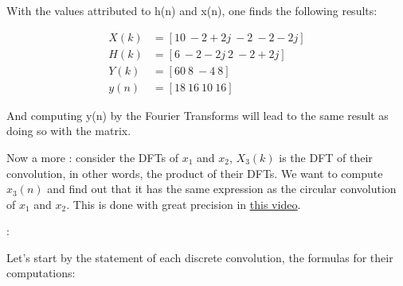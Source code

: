 \documentclass[12pt, a4paper]{article}
\begin{document}
With the values attributed to h(n) and x(n), one finds the following results:

\begin{align*}
    X(k) &= [10 \ -2+2j \ -2 \ -2-2j] \\
    H(k) &= [6 \ -2-2j \ 2 \ -2+2j] \\
    Y(k) &= [60 \ 8 \ -4 \ 8] \\
    y(n) &= [18 \ 16 \ 10 \ 16]
\end{align*}

And computing y(n) by the Fourier Transforms will lead to the same result as doing so with the matrix.


Now a more : consider the DFTs of $x_1$ and $x_2$, $X_3(k)$ is the DFT of their convolution, in other words, the product of their DFTs. We want to compute $x_3(n)$ and find out that it has the same expression as the circular convolution of $x_1$ and $x_2$. This is done with great precision in \href{https://www.youtube.com/watch?v=Gb4loXvvgjY}{\uline{this video}}.

\Vhrulefill

\vspace{1cm}

\Vhrulefill {}: \Vhrulefill

Let's start by the statement of each discrete convolution, the formulas for their computations:

\vspace{1cm}
\end{document}
